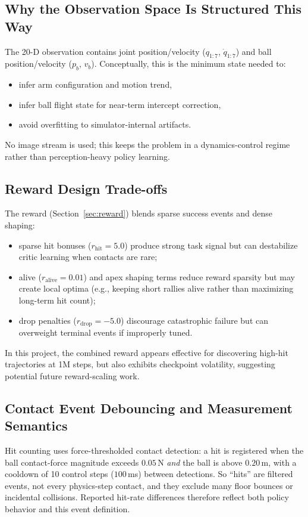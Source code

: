 \documentclass[10pt,twocolumn,letterpaper]{article}
\begin{document}
\subsection{Why the Observation Space Is Structured This Way}
The 20-D observation contains joint position/velocity ($q_{1:7}$, $\dot{q}_{1:7}$) and ball position/velocity ($p_b$, $v_b$). Conceptually, this is the minimum state needed to:
\begin{itemize}[leftmargin=*,noitemsep]
    \item infer arm configuration and motion trend,
    \item infer ball flight state for near-term intercept correction,
    \item avoid overfitting to simulator-internal artifacts.
\end{itemize}
No image stream is used; this keeps the problem in a dynamics-control regime rather than perception-heavy policy learning.

\subsection{Reward Design Trade-offs}
The reward (Section~\ref{sec:reward}) blends sparse success events and dense shaping:
\begin{itemize}[leftmargin=*,noitemsep]
    \item sparse hit bonuses ($r_{\text{hit}} = 5.0$) produce strong task signal but can destabilize critic learning when contacts are rare;
    \item alive ($r_{\text{alive}} = 0.01$) and apex shaping terms reduce reward sparsity but may create local optima (e.g., keeping short rallies alive rather than maximizing long-term hit count);
    \item drop penalties ($r_{\text{drop}} = -5.0$) discourage catastrophic failure but can overweight terminal events if improperly tuned.
\end{itemize}
In this project, the combined reward appears effective for discovering high-hit trajectories at 1M steps, but also exhibits checkpoint volatility, suggesting potential future reward-scaling work.

\subsection{Contact Event Debouncing and Measurement Semantics}
\label{sec:contact_debounce}
Hit counting uses force-thresholded contact detection: a hit is registered when the ball contact-force magnitude exceeds $0.05$\,N \emph{and} the ball is above $0.20$\,m, with a cooldown of 10 control steps ($100$\,ms) between detections. So ``hits'' are filtered events, not every physics-step contact, and they exclude many floor bounces or incidental collisions. Reported hit-rate differences therefore reflect both policy behavior and this event definition.
\end{document}
